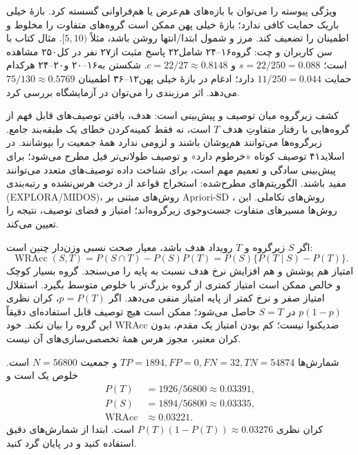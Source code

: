 \documentclass[12pt,a4paper,oneside]{report}
\newcounter{ex}[chapter]
\newenvironment{example}[1]{\refstepcounter{ex}\begin{tcolorbox}[breakable=false,title={مثال \thechapter.\arabic{ex} | #1},colframe=muted,colback=white]}{\end{tcolorbox}}
\begin{document}
ویژگی پیوسته را می‌توان با بازه‌های هم‌عرض یا هم‌فراوانی گسسته کرد. بازهٔ خیلی باریک حمایت کافی ندارد؛ بازهٔ خیلی پهن ممکن است گروه‌های متفاوت را مخلوط و اطمینان را تضعیف کند. مرز و شمول ابتدا/انتها روشن باشد، مثلاً $[5,10)$. مثال کتاب با سن کاربران و چت: گروه۱۶--۲۴ شامل۲۲ پاسخ مثبت از۲۷ نفر در کل۲۵۰ مشاهده است؛ $s=22/250=0.088$ و $c=22/27\approx0.8148$. شکستن به۱۶--۲۰ و۲۰--۲۴ هرکدام حمایت $11/250=0.044$ دارد؛ ادغام در بازهٔ خیلی پهن۱۲--۳۶ اطمینان $75/130\approx0.5769$ می‌دهد. اثر مرزبندی را می‌توان در آزمایشگاه بررسی کرد.

کشف زیرگروه میان توصیف و پیش‌بینی است: هدف، یافتن توصیف‌های قابل فهم از گروه‌هایی با رفتار متفاوتِ هدف $T$ است، نه فقط کمینه‌کردن خطای یک طبقه‌بند جامع. زیرگروه‌ها می‌توانند هم‌پوشان باشند و لزومی ندارد همهٔ جمعیت را بپوشانند. در اسلاید۴۱ توصیف کوتاه «خرطوم دارد» و توصیف طولانی‌تر فیل مطرح می‌شود؛ برای پیش‌بینی سادگی و تعمیم مهم است، برای شناخت داده توصیف‌های متعدد می‌توانند مفید باشند. الگوریتم‌های مطرح‌شده: استخراج قواعد از درخت هرس‌نشده و رتبه‌بندی (EXPLORA/MIDOS)، روش‌های مبتنی بر Apriori-SD ، روش‌های تکاملی. این روش‌ها مسیرهای متفاوت جست‌وجوی زیرگروه‌اند؛ امتیاز و فضای توصیف، نتیجه را تعیین می‌کند.

اگر $S$ زیرگروه و $T$ رویداد هدف باشد، معیار صحت نسبی وزن‌دار چنین است:
\[\operatorname{WRAcc}(S,T)=P(S\cap T)-P(S)P(T)=P(S)\{P(T\mid S)-P(T)\}.\]
امتیاز هم پوشش و هم افزایش نرخ هدف نسبت به پایه را می‌سنجد. گروه بسیار کوچک و خالص ممکن است امتیاز کمتری از گروه بزرگ‌تر با خلوص متوسط بگیرد. استقلال امتیاز صفر و نرخ کمتر از پایه امتیاز منفی می‌دهد. اگر $p=P(T)$، کران نظری $p(1-p)$ در $S=T$ حاصل می‌شود؛ ممکن است هیچ توصیف قابل استفاده‌ای دقیقاً این گروه را بیان نکند. خود WRAcc ضدیکنوا نیست؛ کم بودن امتیاز یک مقدم، بدون کران معتبر، مجوز هرس همهٔ تخصصی‌سازی‌های آن نیست.

\begin{example}{کشف زیرگروه در مثال فیل}
شمارش‌ها $TP=1894,FP=0,FN=32,TN=54874$ و جمعیت $N=56800$ است. خلوص یک است و
\begin{align*}
P(T)&=1926/56800\approx0.03391,\\
P(S)&=1894/56800\approx0.03335,\\
\operatorname{WRAcc}&\approx0.03221.
\end{align*}
کران نظری $P(T)(1-P(T))\approx0.03276$ است. ابتدا از شمارش‌های دقیق استفاده کنید و در پایان گرد کنید.
\end{example}
\end{document}
